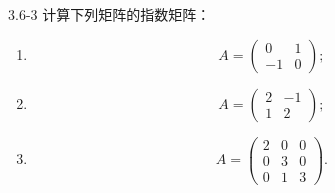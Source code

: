 \documentclass[UTF8,a4paper,11pt]{ctexart}
\begin{document}
\begin{problem}{3.6-3}
计算下列矩阵的指数矩阵：
  \begin{enumerate}[label=(\arabic*)]
    \item
    \[
      A=
      \begin{pmatrix}
        0 & 1\\
        -1 & 0
      \end{pmatrix};
    \]

    \item
    \[
      A=
      \begin{pmatrix}
        2 & -1\\
        1 & 2
      \end{pmatrix};
    \]

    \item
    \[
      A=
      \begin{pmatrix}
        2 & 0 & 0\\
        0 & 3 & 0\\
        0 & 1 & 3
      \end{pmatrix}.
    \]
  \end{enumerate}
\end{problem}
\end{document}
